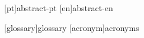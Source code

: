 %
%
%
%
[pt]{abstract-pt}  %
[en]{abstract-en}  %



%
%
%
[glossary]{glossary} 
[acronym]{acronyms}



